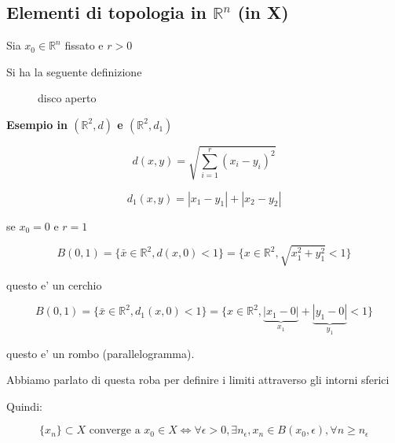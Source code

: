 \documentclass[11pt]{article}
\begin{document}
\subsection{Elementi di topologia in $\mathbb{R}^{n}$ (in X)}

Sia $x_0 \in \mathbb{R}^{n}$ fissato e $r>0$

Si ha la seguente definizione


\begin{figure}[ht]
    \centering
    \caption{disco aperto}
    \label{fig:disco-aperto}
\end{figure}

\textbf{Esempio in $(\mathbb{R}^{2},d)$ e $(\mathbb{R}^{2},d_1)$} 

\[
    d(x,y) = \sqrt{\sum^{r}_{i=1} (x_i-y_i)^{2}}
\]

\[
    d_1(x,y) = |x_1-y_1| + |x_2-y_2|
\]

se $x_0=0$ e $r=1$

\[
    B(0,1)  = \{\bar{x} \in \mathbb{R}^{2}, d(x,0) <1\} = \{x \in  \mathbb{R}^{2}, \sqrt{x_1^{2}+y_1^{2}}<1\}
\]

questo e' un cerchio


\[
    B(0,1)  = \{\bar{x} \in \mathbb{R}^{2}, d_1(x,0) <1\} = \{x \in  \mathbb{R}^{2}, \underbrace{|x_1-0|}_{x_1} + \underbrace{|y_1-0|}_{y_1}<1\}
\]

questo e' un rombo (parallelogramma).


Abbiamo parlato di questa roba per definire i limiti attraverso gli intorni sferici

Quindi:

\[
\{ x_n\} \subset X \text{ converge a } x_0 \in X \Leftrightarrow \forall \epsilon >0 , \exists n_\epsilon, x_n \in B(x_0,\epsilon), \forall n \ge n_\epsilon
\]

\end{document}
